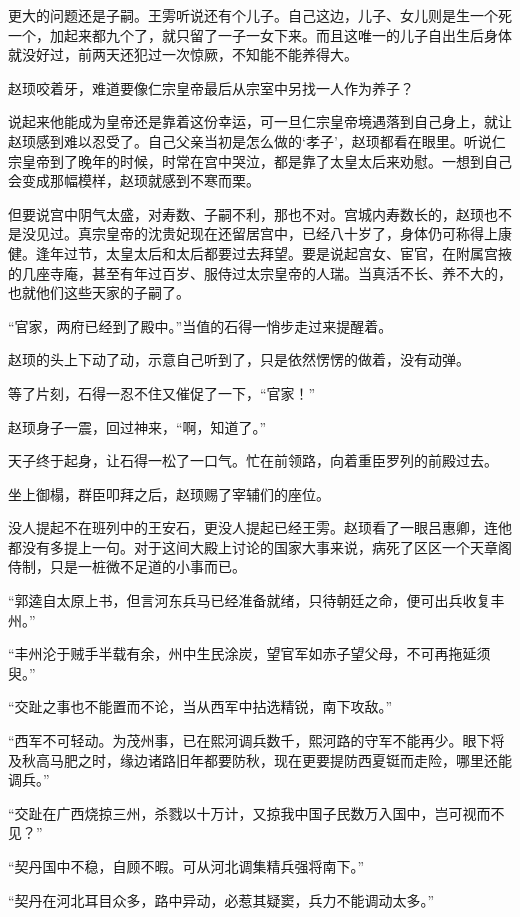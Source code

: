 更大的问题还是子嗣。王雱听说还有个儿子。自己这边，儿子、女儿则是生一个死一个，加起来都九个了，就只留了一子一女下来。而且这唯一的儿子自出生后身体就没好过，前两天还犯过一次惊厥，不知能不能养得大。

赵顼咬着牙，难道要像仁宗皇帝最后从宗室中另找一人作为养子？

说起来他能成为皇帝还是靠着这份幸运，可一旦仁宗皇帝境遇落到自己身上，就让赵顼感到难以忍受了。自己父亲当初是怎么做的‘孝子’，赵顼都看在眼里。听说仁宗皇帝到了晚年的时候，时常在宫中哭泣，都是靠了太皇太后来劝慰。一想到自己会变成那幅模样，赵顼就感到不寒而栗。

但要说宫中阴气太盛，对寿数、子嗣不利，那也不对。宫城内寿数长的，赵顼也不是没见过。真宗皇帝的沈贵妃现在还留居宫中，已经八十岁了，身体仍可称得上康健。逢年过节，太皇太后和太后都要过去拜望。要是说起宫女、宦官，在附属宫掖的几座寺庵，甚至有年过百岁、服侍过太宗皇帝的人瑞。当真活不长、养不大的，也就他们这些天家的子嗣了。

“官家，两府已经到了殿中。”当值的石得一悄步走过来提醒着。

赵顼的头上下动了动，示意自己听到了，只是依然愣愣的做着，没有动弹。

等了片刻，石得一忍不住又催促了一下，“官家！”

赵顼身子一震，回过神来，“啊，知道了。”

天子终于起身，让石得一松了一口气。忙在前领路，向着重臣罗列的前殿过去。

坐上御榻，群臣叩拜之后，赵顼赐了宰辅们的座位。

没人提起不在班列中的王安石，更没人提起已经王雱。赵顼看了一眼吕惠卿，连他都没有多提上一句。对于这间大殿上讨论的国家大事来说，病死了区区一个天章阁侍制，只是一桩微不足道的小事而已。

“郭逵自太原上书，但言河东兵马已经准备就绪，只待朝廷之命，便可出兵收复丰州。”

“丰州沦于贼手半载有余，州中生民涂炭，望官军如赤子望父母，不可再拖延须臾。”

“交趾之事也不能置而不论，当从西军中拈选精锐，南下攻敌。”

“西军不可轻动。为茂州事，已在熙河调兵数千，熙河路的守军不能再少。眼下将及秋高马肥之时，缘边诸路旧年都要防秋，现在更要提防西夏铤而走险，哪里还能调兵。”

“交趾在广西烧掠三州，杀戮以十万计，又掠我中国子民数万入国中，岂可视而不见？”

“契丹国中不稳，自顾不暇。可从河北调集精兵强将南下。”

“契丹在河北耳目众多，路中异动，必惹其疑窦，兵力不能调动太多。”

